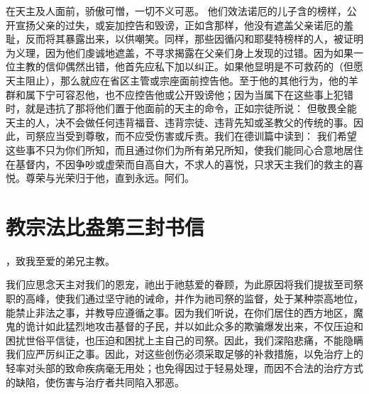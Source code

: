 在天主及人面前，骄傲可憎，一切不义可恶。   他们效法诺厄的儿子含的榜样，公开宣扬父亲的过失，或妄加控告和毁谤，正如含那样，他没有遮盖父亲诺厄的羞耻，反而将其暴露出来，以供嘲笑。同样，那些因循闪和耶斐特榜样的人，被证明为义理，因为他们虔诚地遮盖，不寻求揭露在父亲们身上发现的过错。因为如果一位主教的信仰偶然出错，他首先应私下加以纠正。如果他显明是不可救药的（但愿天主阻止），那么就应在省区主管或宗座面前控告他。至于他的其他行为，他的羊群和属下宁可容忍他，也不应控告他或公开毁谤他；因为当属下在这些事上犯错时，就是违抗了那将他们置于他面前的天主的命令，正如宗徒所说：  但敬畏全能天主的人，决不会做任何违背福音、违背宗徒、违背先知或圣教父的传统的事。因此，司祭应当受到尊敬，而不应受伤害或斥责。我们在德训篇中读到：  我们希望这些事不只为你们所知，而且通过你们为所有弟兄所知，使我们能同心合意地居住在基督内，不因争吵或虚荣而自高自大，不求人的喜悦，只求天主我们的救主的喜悦。尊荣与光荣归于他，直到永远。阿们。\par


\section{教宗法比盎第三封书信}

\par

，致我至爱的弟兄主教。\par

我们应思念天主对我们的恩宠，祂出于祂慈爱的眷顾，为此原因将我们提拔至司祭职的高峰，使我们通过坚守祂的诫命，并作为祂司祭的监督，处于某种崇高地位，能禁止非法之事，并教导应遵循之事。因为我们听说，在你们居住的西方地区，魔鬼的诡计如此猛烈地攻击基督的子民，并以如此众多的欺骗爆发出来，不仅压迫和困扰世俗平信徒，也压迫和困扰上主自己的司祭。因此，我们深陷悲痛，不能隐瞒我们应严厉纠正之事。因此，对这些创伤必须采取足够的补救措施，以免治疗上的轻率对头部的致命疾病毫无用处；也免得因过于轻易处理，而因不合法的治疗方式的缺陷，使伤害与治疗者共同陷入邪恶。\par

